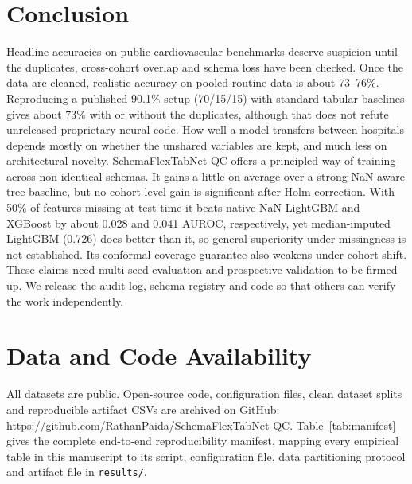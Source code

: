 \documentclass[conference]{IEEEtran}
\newcommand{\sfn}{SchemaFlexTabNet-QC}
\begin{document}
\section{Conclusion}\label{sec:conclusion}
Headline accuracies on public cardiovascular benchmarks deserve suspicion until the duplicates, cross-cohort overlap and schema loss have been checked. Once the data are cleaned, realistic accuracy on pooled routine data is about 73--76\%. Reproducing a published 90.1\% setup (70/15/15) with standard tabular baselines gives about 73\% with or without the duplicates, although that does not refute unreleased proprietary neural code. How well a model transfers between hospitals depends mostly on whether the unshared variables are kept, and much less on architectural novelty. \sfn{} offers a principled way of training across non-identical schemas. It gains a little on average over a strong NaN-aware tree baseline, but no cohort-level gain is significant after Holm correction. With 50\% of features missing at test time it beats native-NaN LightGBM and XGBoost by about 0.028 and 0.041 AUROC, respectively, yet median-imputed LightGBM (0.726) does better than it, so general superiority under missingness is not established. Its conformal coverage guarantee also weakens under cohort shift. These claims need multi-seed evaluation and prospective validation to be firmed up. We release the audit log, schema registry and code so that others can verify the work independently.

\section*{Data and Code Availability}
All datasets are public. Open-source code, configuration files, clean dataset splits and reproducible artifact CSVs are archived on GitHub: \url{https://github.com/RathanPaida/SchemaFlexTabNet-QC}. Table~\ref{tab:manifest} gives the complete end-to-end reproducibility manifest, mapping every empirical table in this manuscript to its script, configuration file, data partitioning protocol and artifact file in \texttt{results/}.
\end{document}
